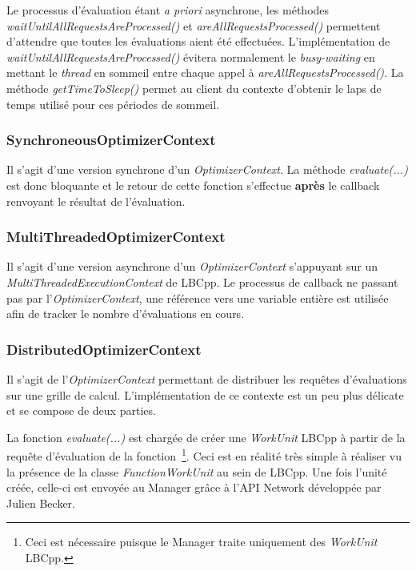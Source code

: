 \documentclass[a4paper, 11pt]{article}
\begin{document}
Le processus d'évaluation étant \textit{a priori} asynchrone, les méthodes \textit{waitUntilAllRequestsAreProcessed()} et \textit{areAllRequestsProcessed()} permettent d'attendre que toutes les évaluations aient été effectuées. L'implémentation de \textit{waitUntilAllRequestsAreProcessed()} évitera normalement le \textit{busy-waiting} en mettant le \textit{thread} en sommeil entre chaque appel à \textit{areAllRequestsProcessed()}. La méthode \textit{getTimeToSleep()} permet au client du contexte d'obtenir le laps de temps utilisé pour ces périodes de sommeil.

\subsubsection{SynchroneousOptimizerContext}
Il s'agit d'une version synchrone d'un \textit{OptimizerContext}. La méthode \textit{evaluate(...)} est donc bloquante et le retour de cette fonction s'effectue \textbf{après} le callback renvoyant le résultat de l'évaluation.

\subsubsection{MultiThreadedOptimizerContext}
Il s'agit d'une version asynchrone d'un \textit{OptimizerContext} s'appuyant sur un \textit{MultiThreadedExecutionContext} de LBCpp. Le processus de callback ne passant pas par l'\textit{OptimizerContext}, une référence vers une variable entière est utilisée afin de tracker le nombre d'évaluations en cours.

\subsubsection{DistributedOptimizerContext}
Il s'agit de l'\textit{OptimizerContext} permettant de distribuer les requêtes d'évaluations sur une grille de calcul. L'implémentation de ce contexte est un peu plus délicate et se compose de deux parties.

La fonction \textit{evaluate(...)} est chargée de créer une \textit{WorkUnit} LBCpp à partir de la requête d'évaluation de la fonction~\footnote{Ceci est nécessaire puisque le Manager traite uniquement des \textit{WorkUnit} LBCpp.}. Ceci est en réalité très simple à réaliser vu la présence de la classe \textit{FunctionWorkUnit} au sein de LBCpp. Une fois l'unité créée, celle-ci est envoyée au Manager grâce à l'API Network développée par Julien Becker.
\end{document}
